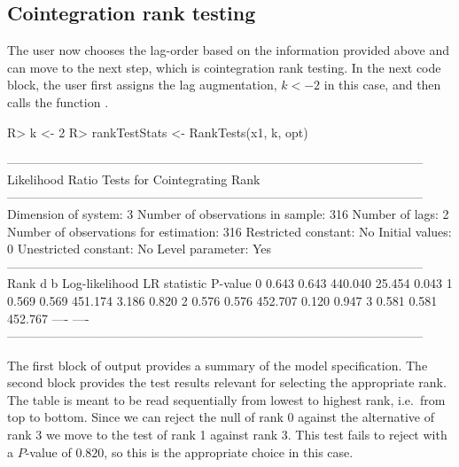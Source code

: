 \documentclass[article]{jss}
\newcommand{\fct}[1]{\code{#1()}}
\begin{document}
\subsection{Cointegration rank testing}

The user now chooses the lag-order based on the information provided above and can move to the next step, which is cointegration rank testing. 
In the next code block, the user first assigns the lag augmentation, $k<-2$ in this case, and then calls the function \fct{RankTests}. 


\begin{CodeChunk} 
\begin{CodeInput}
R> k <- 2
R> rankTestStats <- RankTests(x1, k, opt)
\end{CodeInput}
\begin{CodeOutput}
-----------------------------------------------------------------------------------------------------
                         Likelihood Ratio Tests for Cointegrating Rank                               
-----------------------------------------------------------------------------------------------------
Dimension of system:       3     Number of observations in sample:          316 
Number of lags:            2     Number of observations for estimation:     316 
Restricted constant:      No     Initial values:                              0
Unestricted constant:     No     Level parameter:                           Yes
-----------------------------------------------------------------------------------------------------
Rank 	  d  	  b  	 Log-likelihood	 LR statistic	 P-value
 0   	0.643	0.643	        440.040	       25.454	   0.043
 1   	0.569	0.569	        451.174	        3.186	   0.820
 2   	0.576	0.576	        452.707	        0.120	   0.947
 3   	0.581	0.581	        452.767	         ----	    ----
-----------------------------------------------------------------------------------------------------
\end{CodeOutput}
\end{CodeChunk} 

The first block of output provides a summary of the model specification. The second block provides the test results relevant for selecting the appropriate rank. The table is meant to be read sequentially from lowest to highest rank, i.e.\ from top to bottom. Since we can reject the null of rank 0 against the alternative of rank 3 we move to the test of rank 1 against rank 3. This test fails to reject with a $P$-value of $0.820$, so this is the appropriate choice in this case.
\end{document}
